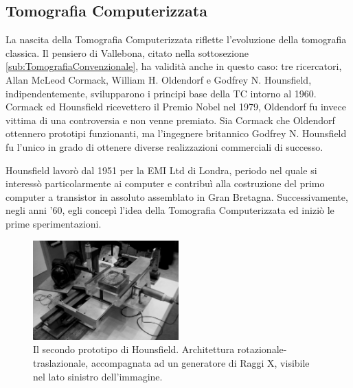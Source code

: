\documentclass[a4paper,12pt, doubleside]{report}
\begin{document}
            \subsection{Tomografia Computerizzata}
                \par      
                    La nascita della Tomografia Computerizzata riflette l'evoluzione della tomografia classica. Il pensiero di Vallebona, citato nella sottosezione \ref{sub:TomografiaConvenzionale}, ha validità anche in questo caso: tre ricercatori, Allan McLeod Cormack, William H. Oldendorf e Godfrey N. Hounsfield, indipendentemente, svilupparono i principi base della TC intorno al 1960. Cormack ed Hounsfield ricevettero il Premio Nobel nel 1979, Oldendorf fu invece vittima di una controversia\cite{nobel-debate} e non venne premiato. 
                    Sia Cormack che Oldendorf ottennero prototipi funzionanti, ma l'ingegnere britannico Godfrey N. Hounsfield fu l'unico in grado di ottenere diverse realizzazioni commerciali di successo.
                
                \bigskip
                \par
                    Hounsfield lavorò dal 1951 per la EMI Ltd di Londra, periodo nel quale si interessò particolarmente ai computer e contribuì alla costruzione del primo computer a transistor in assoluto assemblato in Gran Bretagna\cite{hounsfield-autobiografia}. Successivamente, negli anni '60, egli concepì l’idea della Tomografia Computerizzata ed iniziò le prime sperimentazioni.
                            
                    \begin{figure}[h]
                        \centering
                        \includegraphics[width=0.5\textwidth]{hounsfield_prototype2}
                        \caption{Il secondo prototipo di Hounsfield. Architettura rotazionale-traslazionale, accompagnata ad un generatore di Raggi X, visibile nel lato sinistro dell'immagine.}
                        \label{fig:second-prototype}
                    \end{figure}
                            
\end{document}
